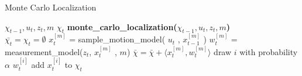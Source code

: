 \documentclass[	DIV=calc,%
							paper=a4,%
							fontsize=9pt,%
							twocolumn]{scrartcl}	 					%
\begin{document}
\begin{algorithm}[h!]
\caption{Monte Carlo Localization}
\begin{algorithmic}[1]
$\chi_{t-1}, u_t, z_t,m$
$\chi_t$
\STATE \textbf{monte\_carlo\_localization(}$\chi_{t-1}, u_t, z_t,m$\textbf{)}\\
\STATE $\bar{\chi_t} = \chi_t = \emptyset$
\STATE {}$x^{[m]}_t$ = sample\_motion\_model( $u_t$ , $x^{[m]}_{t-1}$ )\;\label{alg:motion_model}
\STATE {}$w^{[m]}_t$ = measurement\_model($z_t$, $x^{[m]}_t$ , $m$)\;\label{alg:measurement_model}
\STATE {}$\bar{\chi} = \bar{\chi} + \langle x^{[m]}_t, w^{[m]}_t \rangle $\;
\ENDFOR
{} \label{alg:mcl_resampling}
\STATE draw $i$ with probability $\alpha$  $w^{[i]}_t$\;
\STATE add $x^{[i]}_t $ to $\chi_t$\;
\ENDFOR
\end{algorithmic}
\end{algorithm}
\end{document}
